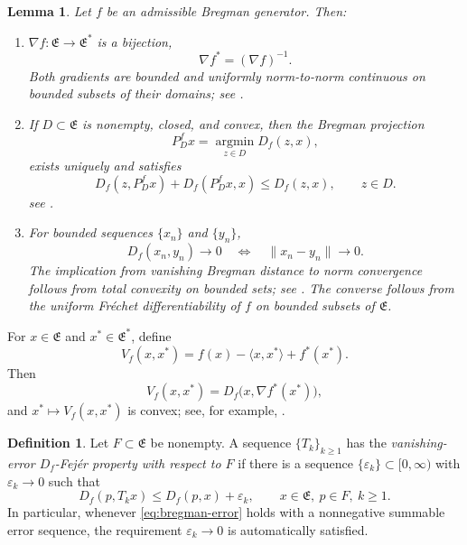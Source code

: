\documentclass[leqno,12pt]{amsart}
\newtheorem{lemma}[theorem]{Lemma}
\theoremstyle{definition}
\newtheorem{definition}[theorem]{Definition}
\theoremstyle{remark}
\numberwithin{equation}{section}
\newcommand{\E}{\mathfrak{E}}
\begin{document}
\begin{lemma}\label{lem:bregman-facts}
Let $f$ be an admissible Bregman generator. Then:
\begin{enumerate}
 \item $\nabla f:\E\to\E^*$ is a bijection,
 \[
  \nabla f^*=(\nabla f)^{-1}.
 \]
 Both gradients are bounded and uniformly norm-to-norm continuous on
 bounded subsets of their domains; see
 \cite{BauschkeBorwein1997,ButnariuIusem2000}.

 \item If $D\subset\E$ is nonempty, closed, and convex, then the Bregman
 projection
 \[
  P_D^f x=\operatorname*{argmin}_{z\in D}D_f(z,x),
 \]
 exists uniquely and satisfies
 \[
  D_f(z,P_D^f x)+D_f(P_D^f x,x)\leq D_f(z,x),
  \qquad z\in D.
 \]
 see
 \cite{AlberButnariu1997,BauschkeBorwein1997,
 ButnariuResmerita2006}.

 \item For bounded sequences $\{x_n\}$ and $\{y_n\}$,
 \begin{equation}\label{eq:bregman-consistency}
  D_f(x_n,y_n)\to0
  \quad\Longleftrightarrow\quad
  \|x_n-y_n\|\to0.
 \end{equation}
 The implication from vanishing Bregman distance to norm convergence
 follows from total convexity on bounded sets; see
 \cite{ButnariuIusemZalinescu2003,ButnariuResmerita2006}.
 The converse follows from the uniform Fr\'echet differentiability of
 $f$ on bounded subsets of $\E$.
\end{enumerate}
\end{lemma}
For $x\in\E$ and $x^*\in\E^*$, define
\[
 V_f(x,x^*)=f(x)-\langle x,x^*\rangle+f^*(x^*).
\]
Then
\begin{equation}\label{eq:V-identity}
 V_f(x,x^*)=D_f\bigl(x,\nabla f^*(x^*)\bigr),
\end{equation}
and $x^*\mapsto V_f(x,x^*)$ is convex; see, for example,
\cite{BauschkeBorwein1997,ButnariuIusem2000}.

\begin{definition}\label{def:bregman-error}
Let $F\subset\E$ be nonempty. A sequence $\{T_k\}_{k\geq1}$ has the \emph{vanishing-error $D_f$-Fej\'er property with respect to $F$} if there is a sequence $\{\varepsilon_k\}\subset[0,\infty)$ with $\varepsilon_k\to0$ such that
\begin{equation}\label{eq:bregman-error}
 D_f(p,T_kx)\leq D_f(p,x)+\varepsilon_k,
 \qquad x\in\E,\ p\in F,\ k\geq1.
\end{equation}
In particular, whenever \eqref{eq:bregman-error} holds with a nonnegative summable error sequence, the requirement $\varepsilon_k\to0$ is automatically satisfied.
\end{definition}
\end{document}
